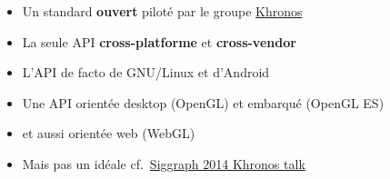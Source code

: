 \begin{frame}
\begin{columns}
\begin{column}{.2\textwidth}
\begin{center}
      \end{center}
    \end{column}
    \begin{column}{.8\textwidth}
      \begin{itemize}
      \item Un standard \textbf{ouvert} piloté par le groupe \href{http://www.khronos.org}{Khronos}
      \item La seule API \textbf{cross-platforme} et \textbf{cross-vendor} %
      \item L'API de facto de GNU/Linux et d'Android
      \item Une API orientée desktop (OpenGL) et embarqué (OpenGL ES)
      \item et aussi orientée web (WebGL)
      \item \alert{Mais pas un idéale} cf.\ \href{https://www.khronos.org/assets/uploads/developers/library/2014-siggraph-bof/OpenGL-Ecosystem-BOF_Aug14.pdf}{Siggraph 2014 Khronos talk}
      \end{itemize}
    \end{column}
  \end{columns}
\end{frame}

